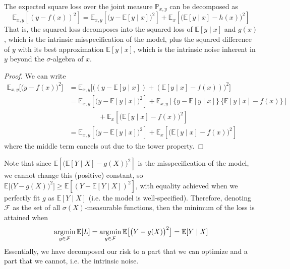   \begin{theorem}
    The expected square loss over the joint measure $\mathbb{P}_{x, y}$ can be decomposed as 
    \begin{equation}
      \mathbb{E}_{x, y} [( y - f(x))^2] = \mathbb{E}_{x, y} [\big(y - \mathbb{E}[y \mid x]\big)^2] + \mathbb{E}_x [\big(\mathbb{E}[y \mid x] - h(x) \big)^2]
    \end{equation}
    That is, the squared loss decomposes into the squared loss of $\mathbb{E}[y \mid x]$ and $g(x)$, which is the intrinsic misspecification of the model, plus the squared difference of $y$ with its best approximation $\mathbb{E}[y \mid x]$, which is the intrinsic noise inherent in $y$ beyond the $\sigma$-algebra of $x$. 
  \end{theorem}
  \begin{proof}
    We can write 
    \begin{align}
      \mathbb{E}_{x, y} \big[ \big(y - f(x)\big)^2 \big] & = \mathbb{E}_{x, y}\big[ \big((y - \mathbb{E}[y \mid x]) + (\mathbb{E}[y \mid x] - f(x)) \big)^2 \big] \\
      & = \mathbb{E}_{x, y} [\big(y - \mathbb{E}[y \mid x]\big)^2] + \mathbb{E}_{x, y} [\{y - \mathbb{E} [y \mid x]\} \, \{ \mathbb{E}[y \mid x] - f(x) \}] \\
      & \;\;\;\;\;\;\;\;\;\;\;\;\;\;\; + \mathbb{E}_x [\big(\mathbb{E}[y \mid x] - f(x) \big)^2] \\
      & = \mathbb{E}_{x, y} [\big(y - \mathbb{E}[y \mid x]\big)^2] + \mathbb{E}_x [\big(\mathbb{E}[y \mid x] - f(x) \big)^2]
    \end{align}
    where the middle term cancels out due to the tower property. 
  \end{proof}

  Note that since $\mathbb{E}[\big(\mathbb{E}[Y \mid X] - g(X) \big)^2]$ is the misspecification of the model, we cannot change this (positive) constant, so $\mathbb{E}\big[ \big(Y - g(X)\big)^2 \big] \geq \mathbb{E}[(Y - \mathbb{E}[Y \mid X])^2]$, with equality achieved when we perfectly fit $g$ as $\mathbb{E}[Y \mid X]$ (i.e. the model is well-specified). Therefore, denoting $\mathcal{F}$ as the set of all $\sigma(X)$-measurable functions, then the minimum of the loss is attained when 
  \begin{equation}
    \operatorname*{\arg\!\min}_{g \in \mathcal{F}} \mathbb{E}[L] = \operatorname*{\arg\!\min}_{g \in \mathcal{F}} \mathbb{E} \big[ \big(Y - g(X)\big)^2 \big] = \mathbb{E}[Y \mid X]
  \end{equation}
  Essentially, we have decomposed our risk to a part that we can optimize and a part that we cannot, i.e. the intrinsic noise. 

